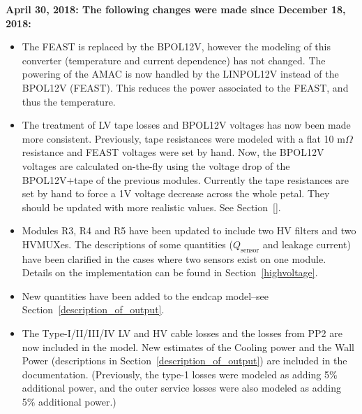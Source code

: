 \documentclass[10pt,]{article}
\begin{document}
{ \bf
April 30, 2018: The following changes were made since December 18, 2018:}
\begin{itemize}
\item The FEAST is replaced by the BPOL12V, however the modeling of this converter (temperature
  and current dependence) has not changed. The powering of the AMAC is now handled by the LINPOL12V
  instead of the BPOL12V (FEAST). This reduces the power associated to the FEAST, and thus the
  temperature.
\item The treatment of LV tape losses and BPOL12V voltages has now been made more consistent. Previously,
  tape resistances were modeled with a flat 10 m$\Omega$ resistance and FEAST voltages were set by hand.
  Now, the BPOL12V voltages are calculated on-the-fly using the voltage drop of the BPOL12V+tape of
  the previous modules. Currently the tape resistances are set by hand to force a 1V voltage decrease
  across the whole petal. They should be updated with more realistic values. See Section~\ref{}.
\item Modules R3, R4 and R5 have been updated to include two HV filters and two HVMUXes. The descriptions
  of some quantities ($Q_\text{sensor}$ and leakage current) have been clarified in the cases where two sensors
  exist on one module. Details on the implementation can be found in Section~\ref{highvoltage}.
\item New quantities have been added to the endcap model--see Section~\ref{description_of_output}.
\item The Type-I/II/III/IV LV and HV cable losses and the losses from PP2 are now included in the model. New
  estimates of the Cooling power and the Wall Power (descriptions in Section~\ref{description_of_output})
  are included in the documentation. (Previously, the type-1 losses were modeled as adding 5\% additional power,
  and the outer service losses were also modeled as adding 5\% additional power.)
\end{itemize}




\clearpage

\clearpage


\clearpage

\clearpage

\clearpage
\begin{appendices}

\end{appendices}
\end{document}
